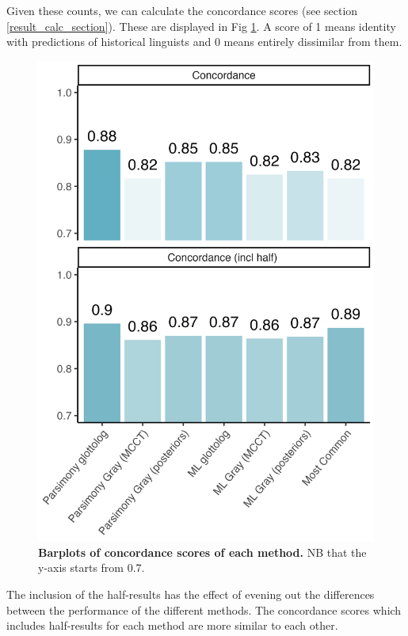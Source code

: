 \documentclass[12pt,letterpaper]{article}
\begin{document}


Given these counts, we can calculate the concordance scores (see section \ref{result_calc_section}). These are displayed in Fig \ref{barplot_facet_results}. A score of 1 means identity with predictions of historical linguists and 0 means entirely dissimilar from them.

\begin{figure}[ht]
\centering
\includegraphics[width=12cm]{illustrations/plots_from_R/results/barplot_facet_scores_exclude_f1.png}
\caption{\textbf{Barplots of concordance scores of each method.} NB that the y-axis starts from 0.7.}
\label{barplot_facet_results}
\end{figure}

The inclusion of the half-results has the effect of evening out the differences between the performance of the different methods. The concordance scores which includes half-results for each method are more similar to each other.
\end{document}
